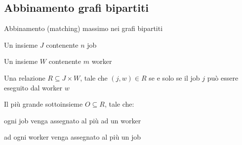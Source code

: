 \subsection{Abbinamento grafi bipartiti}

\begin{frame}{Abbinamento (matching) massimo nei grafi bipartiti}

\vspace{-9pt}
\begin{myboxtitle}
\BIL
\item Un insieme $J$ contenente $n$ job
\item Un insieme $W$ contenente $m$ worker
\item Una relazione $R \subseteq J \times W$, tale che $(j,w) \in R$
se e solo se il job $j$ può essere eseguito dal worker $w$
\EIL
\end{myboxtitle}

\begin{myboxtitle}
\BIL
\item Il più grande sottoinsieme $O \subseteq R$, tale che:
  \BI
  \item ogni job venga assegnato al più ad un worker
  \item ad ogni worker venga assegnato al più un job
  \EI
\EIL
\end{myboxtitle}

\end{frame}
  
